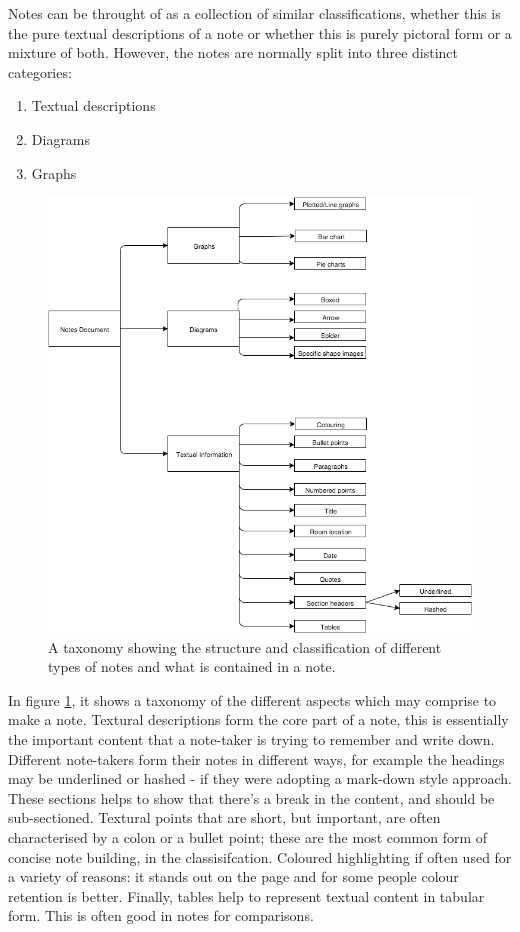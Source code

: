 Notes can be throught of as a collection of similar classifications, whether this is the pure textual descriptions of a note or whether this is purely pictoral form or a mixture of both. However, the notes are normally split into three distinct categories: 
\begin{enumerate}
	\item Textual descriptions
	\item Diagrams 
	\item Graphs
\end{enumerate}
\begin{figure}[h!]
\includegraphics[scale=0.5]{images/taxonomy}
\centering
\caption{A taxonomy showing the structure and classification of different types of notes and what is contained in a note.}
 \label{fig:taxonomyofnotes}
\end{figure}

In figure \ref{fig:taxonomyofnotes}, it shows a taxonomy of the different aspects which may comprise to make a note. Textural descriptions form the core part of a note, this is essentially the important content that a note-taker is trying to remember and write down. Different note-takers form their notes in different ways, for example the headings may be underlined or hashed - if they were adopting a mark-down style approach. These sections helps to show that there's a break in the content, and should be sub-sectioned. Textural points that are short, but important, are often characterised by a colon or a bullet point; these are the most common form of concise note building, in the classisifcation. Coloured highlighting if often used for a variety of reasons: it stands out on the page and for some people colour retention is better. Finally, tables help to represent textual content in tabular form.  This is often good in notes for comparisons. 

